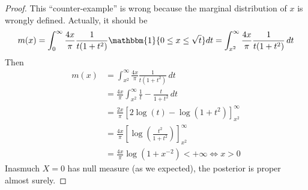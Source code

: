 \begin{proof}
    This ``counter-example'' is wrong because the marginal distribution of $x$
    is wrongly defined. Actually, it should be
    $$
    m(x) = \int_0^{\infty} \frac{4x}{\pi}\frac{1}{t(1+t^2)}\mathbbm{1}\{0 \le x \le \sqrt{t}\}dt = \int_{x^2}^{\infty} \frac{4x}{\pi}\frac{1}{t(1+t^2)} \,dt
    $$
    Then 
    \begin{equation*}
        \begin{split}
            m(x) &= \int_{x^2}^{\infty} \frac{4x}{\pi}\frac{1}{t(1+t^2)} \, dt \\
            &=  \frac{4x}{\pi} \int_{x^2}^{\infty} \frac{1}{t} - \frac{t}{1+t^2} \,dt \\
            &= \frac{2x}{\pi}\left[
                2\log(t) - \log(1+t^2)
            \right]_{x^2}^{\infty} \\
            &= \frac{4x}{\pi}\left[
                \log\left(\frac{t^2}{1 + t^2}\right)
            \right]_{x^2}^{\infty} \\
            &= \frac{4x}{\pi}\log(1 + x^{-2}) < + \infty \iff x > 0
        \end{split}
    \end{equation*}
    Inasmuch $X = 0$ has null measure (as we expected), the posterior is proper almost surely. 
\end{proof} 